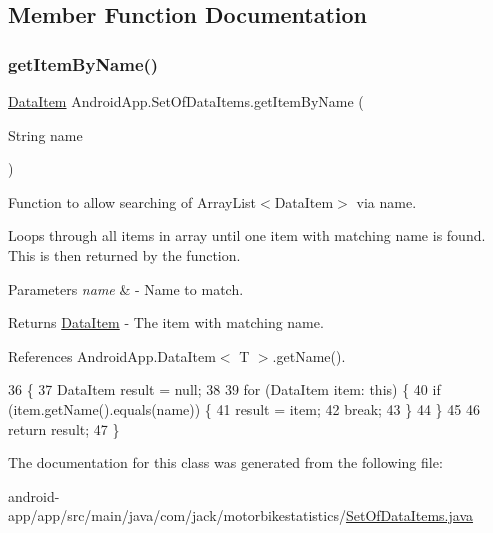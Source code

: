 \subsection{Member Function Documentation}
\mbox{\label{class_android_app_1_1_set_of_data_items_aa559ef3701bb9f59f124ddddc56a2a38}} 
\subsubsection{\texorpdfstring{get\+Item\+By\+Name()}{getItemByName()}}
{\footnotesize\ttfamily \hyperlink{class_android_app_1_1_data_item}{Data\+Item} Android\+App.\+Set\+Of\+Data\+Items.\+get\+Item\+By\+Name (\begin{DoxyParamCaption}\item[{String}]{name }\end{DoxyParamCaption})\hspace{0.3cm}{\ttfamily [inline]}}



Function to allow searching of Array\+List$<$\+Data\+Item$>$ via name. 

Loops through all items in array until one item with matching name is found. This is then returned by the function.


\begin{DoxyParams}{Parameters}
{\em name} & -\/ Name to match. \\
\hline
\end{DoxyParams}
\begin{DoxyReturn}{Returns}
\hyperlink{class_android_app_1_1_data_item}{Data\+Item} -\/ The item with matching name. 
\end{DoxyReturn}


References Android\+App.\+Data\+Item$<$ T $>$.\+get\+Name().


\begin{DoxyCode}
36                                                \{
37         DataItem result = null;
38 
39         \textcolor{keywordflow}{for} (DataItem item: \textcolor{keyword}{this}) \{
40             \textcolor{keywordflow}{if} (item.getName().equals(name)) \{
41                 result = item;
42                 \textcolor{keywordflow}{break};
43             \}
44         \}
45 
46         \textcolor{keywordflow}{return} result;
47     \}
\end{DoxyCode}


The documentation for this class was generated from the following file\+:\begin{DoxyCompactItemize}
\item 
android-\/app/app/src/main/java/com/jack/motorbikestatistics/\hyperlink{_set_of_data_items_8java}{Set\+Of\+Data\+Items.\+java}\end{DoxyCompactItemize}

